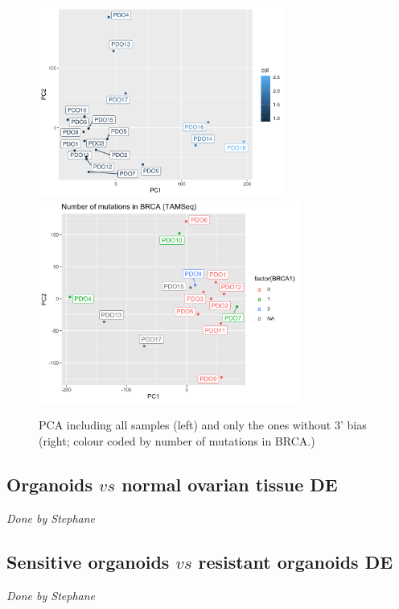 \documentclass{article}
\begin{document}
\begin{figure}[h]
\centering
\includegraphics[width=3.2in]{../../RNASeq_DE_resistant_sensitive/figures/PCA_RNASeq/3primebias_PCA_counts.pdf}
\includegraphics[width=3.4in]{../../RNASeq_DE_resistant_sensitive/figures/PCA_RNASeq/PCA_counts_subset_BRCA_TAMSeq.png}
\caption{PCA including all samples (left) and only the ones without 3' bias (right; colour coded by number of mutations in BRCA.)}
\end{figure}

\subsection{Organoids $vs$ normal ovarian tissue DE}

\begin{center} \emph{Done by Stephane} \end{center}

\subsection{Sensitive organoids $vs$ resistant organoids DE}
\begin{center} \emph{Done by Stephane} \end{center}
\end{document}
